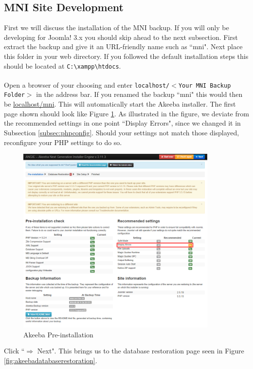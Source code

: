 \documentclass[]{report}
\begin{document}
\subsection{MNI Site Development}

First we will discuss the installation of the MNI backup. If you will only be developing for Joomla! 3.x you should skip ahead to the next subsection. First extract the backup and give it an URL-friendly name such as ``mni". Next place this folder in your web directory. If you followed the default installation steps this should be located at \texttt{C:\textbackslash xampp\textbackslash htdocs}.\\
\\
Open a browser of your choosing and enter \texttt{localhost/$<$Your MNI Backup Folder$>$} in the address bar. If you renamed the backup ``mni" this would then be \url{localhost/mni}. This will automatically start the Akeeba installer. The first page shown should look like Figure \ref{fig:akeebapreinstallation}. As illustrated in the figure, we deviate from the recommended settings in one point ``Display Errors", since we changed it in Subsection \ref{subsec:phpconfig}. Should your settings not match those displayed, reconfigure your PHP settings to do so.\\

\begin{figure}[h] 
	\centering
	\includegraphics[width=10cm]{akeeba1.png}
	\caption{Akeeba Pre-installation}
	\label{fig:akeebapreinstallation}
\end{figure}

\noindent
Click ``$\Rightarrow$ Next". This brings us to the database restoration page seen in Figure \ref{fig:akeebadatabaserestoration}.
\end{document}
